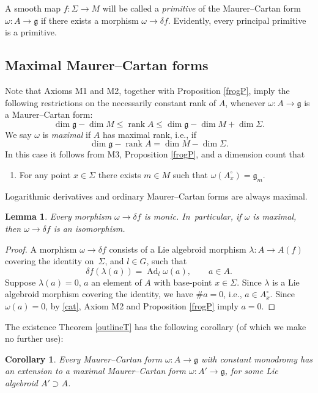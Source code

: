 \documentclass[pdftex]{sigma}%
\numberwithin{equation}{section}
\newtheorem{Corollary}[Theorem]{Corollary}
\newtheorem{Lemma}[Theorem]{Lemma}
\DeclareMathOperator{\rank}{rank} \DeclareMathOperator{\image}{im}
\DeclareMathOperator{\Adjoint}{Ad}
\DeclareMathOperator{\dimension}{dim}
\renewcommand{\le}{\leqslant}
\begin{document}
A smooth map $f \colon \Sigma \rightarrow M$ will be called a {\it primitive} of the Maurer--Cartan form
$\omega \colon A \rightarrow {\mathfrak g} $ if there exists a
morphism $\omega \rightarrow \delta f$. Evidently, every principal
primitive is a primitive.

\subsection*{Maximal Maurer--Cartan forms}%

Note that Axioms M1 and M2, together with Proposition \ref{frogP},
imply the following restrictions on the necessarily constant rank of
$A$, whenever $\omega \colon A \rightarrow {\mathfrak g} $ is a
Maurer--Cartan form:
\begin{equation*}
\dimension {\mathfrak g} -\dimension M\le \rank A
\le \dimension {\mathfrak g} -\dimension M + \dimension \Sigma.
\end{equation*}
We say $\omega $ is {\it maximal} if $A$ has maximal
rank, i.e., if
\[
\dim {\mathfrak g}-\rank A = \dimension M - \dimension \Sigma.
\]
In
this case it follows from M3, Proposition \ref{frogP}, and a dimension
count that
\begin{enumerate}\itemsep=0pt
\item[M3$'$.] For any point $x \in \Sigma $ there exists $m \in M$
such that $\omega(A^\circ_x) = {\mathfrak g}_m$.
\end{enumerate} Logarithmic derivatives and ordinary Maurer--Cartan
forms are always maximal.
%
\begin{Lemma}%
 Every morphism $\omega \rightarrow \delta f$ is monic. In~particular, if $\omega $ is maximal, then
 $\omega \rightarrow \delta f$ is an isomorphism.
\end{Lemma}

\begin{proof} A morphism $\omega \rightarrow \delta f$ consists of a
Lie algebroid morphism $\lambda \colon A \rightarrow A(f)$ covering
the identity on~$\Sigma$, and $l \in G$, such that
 \begin{equation}
 \delta f (\lambda(a))=\Adjoint_l \omega(a), \qquad a \in A.\label{cat}
 \end{equation}
 Suppose $\lambda(a)=0$, $a$ an element of $A $ with
base-point $x \in \Sigma $. Since $\lambda$ is a Lie algebroid
morphism covering the identity, we have $\# a =0$, i.e., $a \in
A^\circ_x$. Since $\omega(a)=0$, by \eqref{cat}, Axiom M2 and
Proposition \ref{frogP} imply $a=0$.
\end{proof}
%
The existence Theorem \ref{outlineT} has the following corollary (of
which we make no further use):
\begin{Corollary}%
 Every Maurer--Cartan form
 $\omega \colon A \rightarrow {\mathfrak g} $ with constant monodromy
 has an extension to a maximal Maurer--Cartan form
 $\omega \colon A' \rightarrow {\mathfrak g} $, for some Lie
 algebroid $A' \supset A$.
\end{Corollary}
\end{document}
